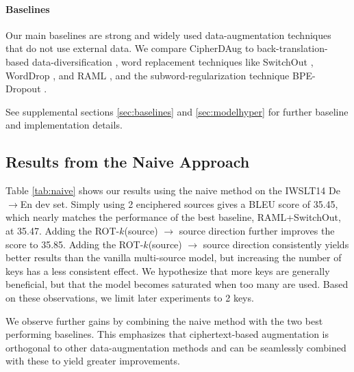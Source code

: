 \documentclass[11pt]{article}
\begin{document}
\vspace{-0.5em}
\paragraph{Baselines} Our main baselines are strong and widely used data-augmentation techniques that do not use external data. We compare CipherDAug to back-translation-based data-diversification \cite{nguyen19datadiverse}, word replacement techniques like SwitchOut \cite{wang-etal-2018-switchout}, WordDrop \cite{sennrich-etal-2016-edinburgh}, and RAML \cite{Norouzi2016RewardAM}, and the subword-regularization technique BPE-Dropout \cite{provilkov2020bpe}.

See supplemental sections \ref{sec:baselines} and \ref{sec:modelhyper} for further baseline and implementation details.
\subsection{Results from the Naive Approach}\label{sec:naive-results}
Table \ref{tab:naive} shows our results using the naive method on the IWSLT14 De$\rightarrow$En dev set. Simply using 2 enciphered sources gives a BLEU score of 35.45, which nearly matches the performance of the best baseline, RAML+SwitchOut, at 35.47. Adding the ROT-$k$(source) $\rightarrow$ source direction further improves the score to 35.85. 
Adding the ROT-$k$(source) $\rightarrow$ source direction consistently yields better results than the vanilla multi-source model, but increasing the number of keys has a less consistent effect. We hypothesize that more keys are generally beneficial, but that the model becomes saturated when too many are used. Based on these observations, we limit later experiments to 2 keys.

We observe further gains by combining the naive method with the two best performing baselines. This emphasizes that ciphertext-based augmentation is orthogonal to other data-augmentation methods and can be seamlessly combined with these to yield greater improvements.
\end{document}
